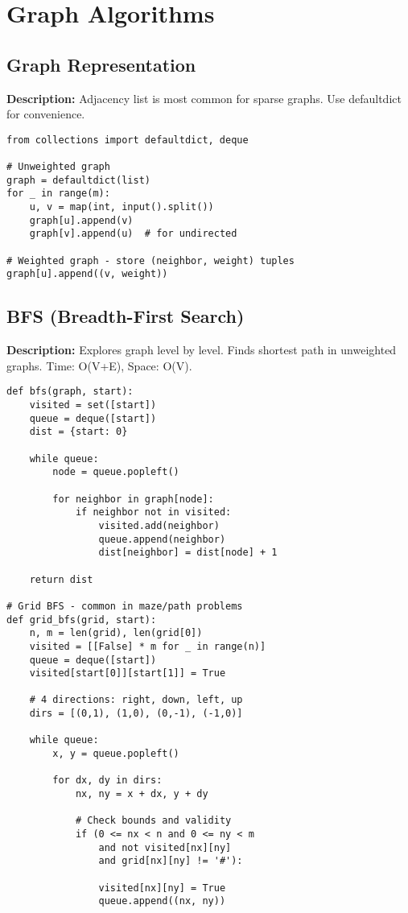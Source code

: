 \section{Graph Algorithms}

\subsection{Graph Representation}
\textbf{Description:} Adjacency list is most common for sparse graphs. Use defaultdict for convenience.

\begin{lstlisting}
from collections import defaultdict, deque

# Unweighted graph
graph = defaultdict(list)
for _ in range(m):
    u, v = map(int, input().split())
    graph[u].append(v)
    graph[v].append(u)  # for undirected

# Weighted graph - store (neighbor, weight) tuples
graph[u].append((v, weight))
\end{lstlisting}

\subsection{BFS (Breadth-First Search)}
\textbf{Description:} Explores graph level by level. Finds shortest path in unweighted graphs. Time: O(V+E), Space: O(V).

\begin{lstlisting}
def bfs(graph, start):
    visited = set([start])
    queue = deque([start])
    dist = {start: 0}
    
    while queue:
        node = queue.popleft()
        
        for neighbor in graph[node]:
            if neighbor not in visited:
                visited.add(neighbor)
                queue.append(neighbor)
                dist[neighbor] = dist[node] + 1
    
    return dist

# Grid BFS - common in maze/path problems
def grid_bfs(grid, start):
    n, m = len(grid), len(grid[0])
    visited = [[False] * m for _ in range(n)]
    queue = deque([start])
    visited[start[0]][start[1]] = True
    
    # 4 directions: right, down, left, up
    dirs = [(0,1), (1,0), (0,-1), (-1,0)]
    
    while queue:
        x, y = queue.popleft()
        
        for dx, dy in dirs:
            nx, ny = x + dx, y + dy
            
            # Check bounds and validity
            if (0 <= nx < n and 0 <= ny < m 
                and not visited[nx][ny] 
                and grid[nx][ny] != '#'):
                
                visited[nx][ny] = True
                queue.append((nx, ny))
\end{lstlisting}

